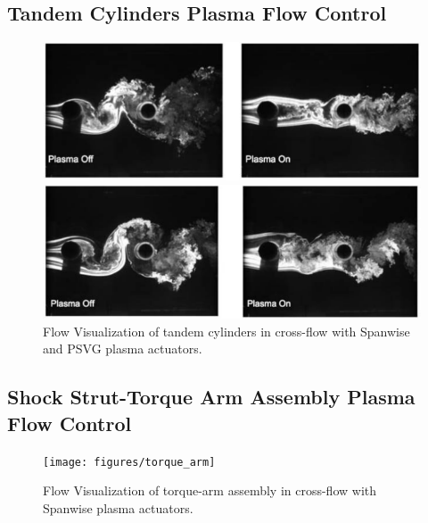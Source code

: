\subsection{Tandem Cylinders Plasma Flow Control}

\cite{kozlov}
\cite{khorami}
\cite{huang1}
\cite{huang2}



\begin{figure}
	\begin{center}
		\centerline{\includegraphics[scale=1.0]{figures/tandem_span}}
		\centerline{\includegraphics[scale=1.0]{figures/tandem_psvg}}
		\caption{Flow Visualization of tandem cylinders in cross-flow with Spanwise and PSVG plasma actuators.}
		\label{fig:cyl2}
	\end{center}
\end{figure}

\subsection{Shock Strut-Torque Arm Assembly Plasma Flow Control}

\begin{figure}
	\begin{center}
		\centerline{\texttt{[image: figures/torque\_arm]}}
		\caption{Flow Visualization of torque-arm assembly in cross-flow with Spanwise plasma actuators.}
		\label{fig:cyl2}
	\end{center}
\end{figure}


